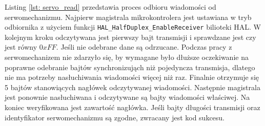 Listing \ref{lst: servo_read} przedstawia proces odbioru wiadomości od serwomechanizmu. Najpierw magistrala mikrokontrolera jest ustawiana w tryb odbiornika z użyciem funkcji \texttt{HAL\_HalfDuplex\_EnableReceiver} bilioteki HAL. W kolejnym kroku odczytywana jest pierwszy bajt transmisji i sprawdzane jest czy jest równy $0xFF$. Jeśli nie odebrane dane są odrzucane. Podczas pracy z serwomechanizem nie zdarzyło się, by wymagane było dłuższe oczekiwanie na poprawne odebranie bajtów synchronizująch niż pojedyncza transmisja, dlatego nie ma potrzeby nasłuchiwania wiadomości więcej niż raz. Finalnie otrzymuje się 5 bajtów stanowiących nagłówek odczytywanej wiadomości. Następnie magistrala jest ponownie nasłuchiwana i odczytywane są bajty wiadomości właściwej. Na koniec weryfikowana jest zawartość nagłówka. Jeśli bajty długości transmisji oraz identyfikator serwomechanizmu są zgodne, zwracany jest kod sukcesu. 

